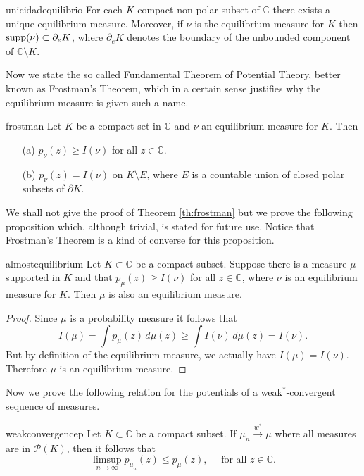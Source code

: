 \begin{mytheo}{}{unicidadequilibrio}
For each $K$ compact non-polar subset of $\mathbb{C}$ there exists a unique equilibrium measure. Moreover, if $\nu$ is the equilibrium measure for $K$ then $\text{supp}(\nu) \subset\partial_e K$, where $\partial_e K$ denotes the boundary of the unbounded component of $\mathbb{C}\setminus K$.
\end{mytheo}

Now we state the so called Fundamental Theorem of Potential Theory, better known as Frostman's Theorem, which in a certain sense justifies why the equilibrium measure is given such a name.

\begin{mytheo}{}{frostman}
Let $K$ be a compact set in $\mathbb{C}$ and $\nu$ an equilibrium measure for $K$. Then
\begin{itemize}
\item[(a)] $p_\nu(z) \geq I(\nu)$ for all $z\in \mathbb{C}$.\\
\item[(b)] $p_\nu(z)=I(\nu)$ on $K\setminus E$, where $E$ is a countable union of closed polar subsets of $\partial K$.
\end{itemize}
\end{mytheo}

We shall not give the proof of Theorem \ref{th:frostman} but we prove the following proposition which, although trivial, is stated for future use. Notice that Frostman's Theorem is a kind of converse for this proposition.

\begin{myprop}{}{almostequilibrium}
Let $K\subset \mathbb{C}$ be a compact subset. Suppose there is a measure $\mu$ supported in $K$ and that $p_\mu(z) \geq I(\nu)$ for all $z\in \mathbb{C}$, where $\nu$ is an equilibrium measure for $K$. Then $\mu$ is also an equilibrium measure.
\end{myprop}
\begin{proof}
Since $\mu$ is a probability measure it follows that
$$I(\mu)=\int p_\mu(z)\,d\mu(z) \geq \int I(\nu)\,d\mu(z)=I(\nu).$$
But by definition of the equilibrium measure, we actually have $I(\mu)=I(\nu)$. Therefore $\mu$ is an equilibrium measure.
\end{proof}


Now we prove the following relation for the potentials of a weak$^*$-convergent sequence of measures.\\

\begin{myprop}{}{weakconvergencep}
Let $K\subset \mathbb{C}$ be a compact subset. If $\mu_n \overset{w^*}{\rightarrow} \mu$ where all measures are in $\mathcal{P}(K)$, then it follows that
$$\limsup_{n\rightarrow \infty} p_{\mu_n}(z) \leq p_{\mu}(z), \quad \text{ for all } z\in \mathbb{C}.$$
\end{myprop}

